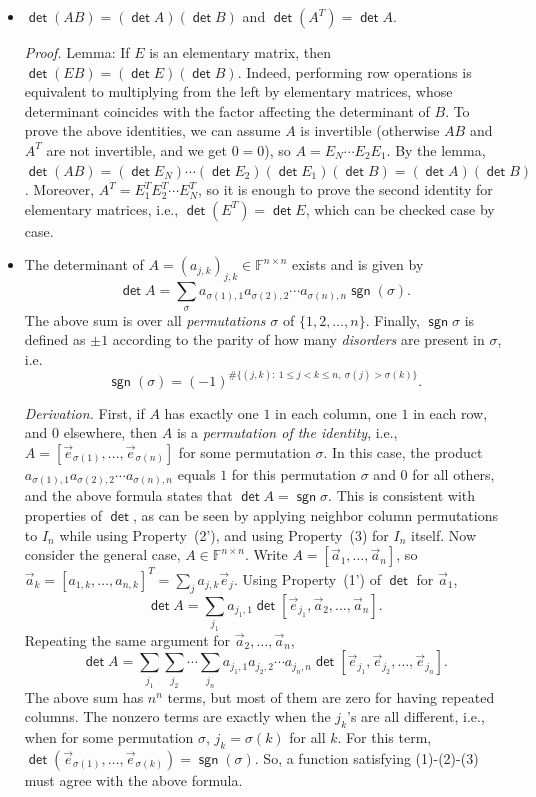\documentclass[11pt]{article}
\newcommand{\1}{\mathbf{1}}
\newcommand{\0}{\mathbf{0}}
\newcommand{\F}{\mathbb{F}}
\DeclareMathOperator{\mydet}{\mathsf{det}}
\DeclareMathOperator{\mysgn}{\mathsf{sgn}}
\newcommand{\va}{\vec{a}}
\newcommand{\ve}{\vec{e}}
\renewcommand{\leq}{\leqslant}
\begin{document}
\begin{itemize}

\item

$\mydet(AB)=(\mydet A)(\mydet B)$
and
$\mydet (A^T) = \mydet A$.

\emph{Proof.}
Lemma: If $E$ is an elementary matrix, then $\mydet(EB)=(\mydet E)(\mydet B)$.
Indeed, performing row operations is equivalent to multiplying from the left by elementary matrices, whose determinant coincides with the factor affecting the determinant of $B$.
To prove the above identities, we can assume $A$ is invertible (otherwise $AB$ and $A^T$ are not invertible, and we get $0=0$), so $A=E_N\cdots E_2E_1$.
By the lemma, $\mydet(AB)=(\mydet E_N)\cdots(\mydet E_2)(\mydet E_1)(\mydet B)=(\mydet A)(\mydet B)$.
Moreover, $A^T = E_1^T E_2^T \cdots E_N^T$, so it is enough to prove the second identity for elementary matrices, i.e., $\mydet (E^T) = \mydet E$, which can be checked case by case.


\item

The determinant of $A=(a_{j,k})_{j,k} \in \F^{n \times n}$ exists and is given by
\[
\mydet A = \sum_{\sigma} a_{\sigma(1),1}a_{\sigma(2),2} \cdots a_{\sigma(n),n} \mysgn(\sigma).
\]
The above sum is over all \emph{permutations} $\sigma$ of $\{1,2,\dots,n\}$.
Finally, $\mysgn \sigma$ is defined as $\pm 1$ according to the parity of how many \emph{disorders} are present in $\sigma$, i.e.
\[
\mysgn (\sigma)=(-1)^{\#\{(j,k):\ 1\leq j<k\leq n,\ \sigma(j)>\sigma(k)\}}.
\]

\emph{Derivation.}
First, if $A$ has exactly one $1$ in each column, one $1$ in each row, and $0$ elsewhere, then $A$ is a \emph{permutation of the identity}, i.e., $A=[\ve_{\sigma(1)},\dots,\ve_{\sigma(n)}]$ for some permutation $\sigma$.
In this case, the product $a_{\sigma(1),1}a_{\sigma(2),2} \cdots a_{\sigma(n),n}$ equals $1$ for this permutation $\sigma$ and $0$ for all others, and the above formula states that $\mydet A = \mysgn \sigma$.
This is consistent with properties of $\mydet$, as can be seen by applying neighbor column permutations to $I_n$ while using Property~(2'), and using Property~(3) for $I_n$ itself.
Now consider the general case, $A \in \F^{n\times n}$.
Write $A = [\va_1, \dots, \va_n]$, so $\va_k = [a_{1,k},\dots,a_{n,k}]^T = \sum_j a_{j,k} \ve_j$.
Using Property~(1') of $\mydet$ for $\va_1$,
\[
\mydet A = \sum_{j_1} a_{j_1,1} \mydet [\ve_{j_1},\va_2,\dots,\va_n]
.
\]
Repeating the same argument for $\va_2,\dots,\va_n$,
\[
\mydet A = \sum_{j_1} \sum_{j_2} \cdots \sum_{j_n} a_{j_1,1} a_{j_2,2} \cdots a_{j_n,n} \mydet [\ve_{j_1},\ve_{j_2},\dots,\ve_{j_n}]
.
\]
The above sum has $n^n$ terms, but most of them are zero for having repeated columns.
The nonzero terms are exactly when the $j_k$'s are all different, i.e., when for some permutation $\sigma$, $j_k=\sigma(k)$ for all $k$.
For this term, $\mydet(\ve_{\sigma(1)},\dots,\ve_{\sigma(k)})=\mysgn(\sigma)$.
So, a function satisfying (1)-(2)-(3) must agree with the above formula.


\end{itemize}
\end{document}
